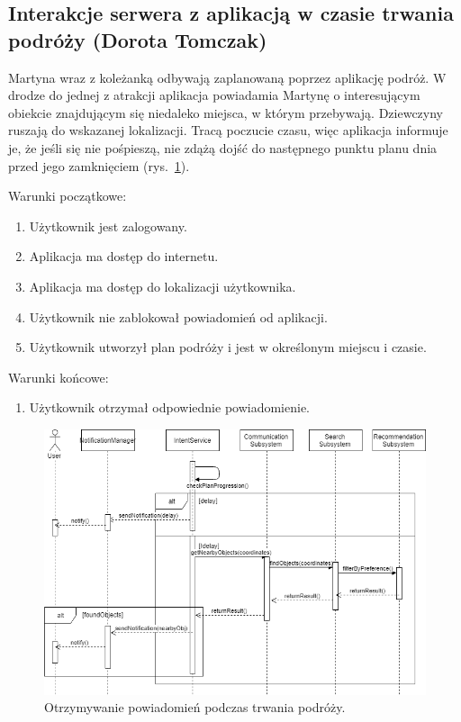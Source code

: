 \documentclass[10pt,twoside,a4paper]{report}
\begin{document}
\subsection{Interakcje serwera z aplikacją w czasie trwania podróży (Dorota Tomczak)}
\par Martyna wraz z koleżanką odbywają zaplanowaną poprzez aplikację podróż. W drodze do jednej z atrakcji aplikacja powiadamia Martynę o interesującym obiekcie znajdującym się niedaleko miejsca, w którym przebywają. Dziewczyny ruszają do wskazanej lokalizacji. Tracą poczucie czasu, więc aplikacja informuje je, że jeśli się nie pośpieszą, nie zdążą dojść do następnego punktu planu dnia przed jego zamknięciem (rys.~\ref{fig:whileTravelling}).

\noindent\newline Warunki początkowe:
\begin{enumerate}
  \item Użytkownik jest zalogowany.
  \item Aplikacja ma dostęp do internetu.
  \item Aplikacja ma dostęp do lokalizacji użytkownika.
  \item Użytkownik nie zablokował powiadomień od aplikacji.
  \item Użytkownik utworzył plan podróży i jest w określonym miejscu i czasie.
\end{enumerate}
\par
\noindent\newline
Warunki końcowe:
\begin{enumerate}
  \item Użytkownik otrzymał odpowiednie powiadomienie.
\end{enumerate}

\noindent\newline
\begin{figure}[h]
\centering
\includegraphics[width=\linewidth]{whileTravelling}
\caption{Otrzymywanie powiadomień podczas trwania podróży.}
\label{fig:whileTravelling}
\end{figure}
\end{document}
